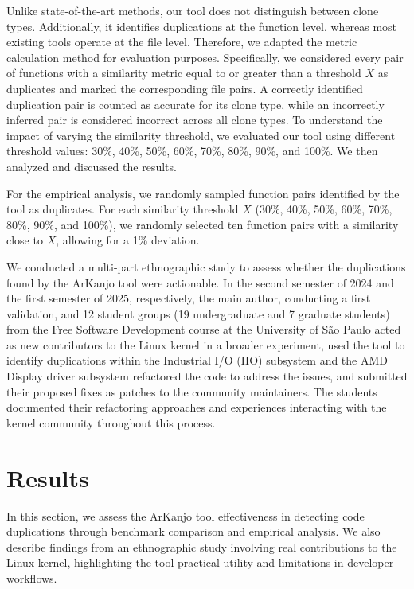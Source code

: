 \documentclass[conference]{IEEEtran}
\begin{document}
Unlike state-of-the-art methods, our tool does not distinguish between clone types. 
Additionally, it identifies duplications at the function level, whereas most existing tools operate at the file level.
Therefore, we adapted the metric calculation method for evaluation
purposes. Specifically, we considered every pair of functions with a similarity metric
equal to or greater than a threshold $X$ as duplicates and marked the corresponding file
pairs. A correctly identified duplication pair is counted as accurate for its clone type, while
an incorrectly inferred pair is considered incorrect across all clone types.
To understand the impact of varying the similarity threshold, we evaluated our tool using
different threshold values: 30\%, 40\%, 50\%, 60\%, 70\%, 80\%, 90\%, and 100\%. We then analyzed
and discussed the results.

For the empirical analysis, we randomly sampled function pairs identified by the tool as
duplicates. For each similarity threshold $X$ (30\%, 40\%, 50\%, 60\%, 70\%, 80\%, 90\%, and 100\%), 
we randomly selected ten function pairs with a similarity close to $X$, allowing for a 1\%
deviation.

We conducted a multi-part ethnographic study to assess whether the duplications found by the ArKanjo tool were actionable. In the second semester of 2024 and the first semester of 2025, respectively, the main author, conducting a first validation, and 12 student groups (19 undergraduate and 7 graduate students) from the Free Software Development course at the University of São Paulo acted as new contributors to the Linux kernel in a broader experiment, used the tool to identify duplications within the Industrial I/O (IIO) subsystem and the AMD Display driver subsystem refactored the code to address the issues, and submitted their proposed fixes as patches to the community maintainers. The students documented their refactoring approaches and experiences interacting with the kernel community throughout this process.


\section{Results}

In this section, we assess the ArKanjo tool effectiveness in detecting code duplications through benchmark comparison and empirical analysis. We also describe findings from an ethnographic study involving real contributions to the Linux kernel, highlighting the tool practical utility and limitations in developer workflows.
\end{document}
